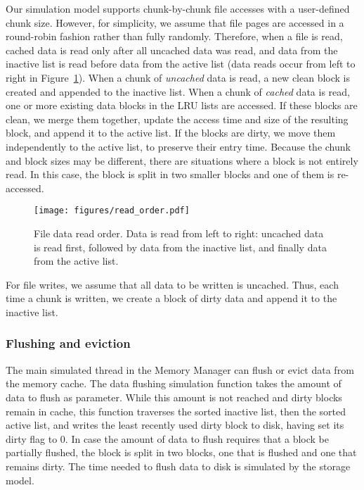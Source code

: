 \documentclass[conference]{IEEEtran}
\begin{document}
    Our simulation model supports chunk-by-chunk file accesses
    with a user-defined chunk size. However, for simplicity, we assume that file pages are
    accessed in a round-robin fashion rather than fully randomly.
    Therefore, when a file is read, cached data is read only after all uncached data was read, and data from the inactive list is read
    before data from the active list
    (data reads occur from left to right in Figure~\ref{fig:read_order}).
    When a chunk of \emph{uncached} data is read, a new clean block is created
    and appended to the inactive list.
    When a chunk of \emph{cached} data is read, one or more existing data blocks in the LRU lists are accessed.
    If these blocks are clean, we merge them together, update the access time and size of the resulting block,
    and append it to the active list.
    If the blocks are dirty, we move them independently to the active list, to preserve their entry time.
    Because the chunk and block sizes may be different, there are situations
    where a block is not entirely read.
    In this case, the block is split in two smaller blocks and one of them is re-accessed.
    \begin{figure}
           \centering
           \texttt{[image: figures/read\_order.pdf]}
           \caption{File data read order. Data is read from left to right: uncached data
           is read first, followed by data from the inactive list, and finally data from the active list. }
           \label{fig:read_order}
    \end{figure}

    For file writes, we assume that all data to be written is
    uncached. Thus, each time a chunk is written, we create a block of dirty data
    and append it to the inactive list.

    \subsubsection{Flushing and eviction}

    The main simulated thread in the Memory Manager can flush or evict data from the
    memory cache. The data flushing simulation
    function takes the amount of data to flush as parameter. While
    this amount is not reached and dirty
    blocks remain in cache, this function traverses the sorted
    inactive list, then the sorted active list, and writes the
    least recently used dirty block to disk, having set its dirty
    flag to 0. In case the amount of data to flush requires that a
    block be partially flushed, the block is split in two blocks,
    one that is flushed and one that remains dirty. The time needed
    to flush data to disk is simulated by the storage model.
\end{document}
